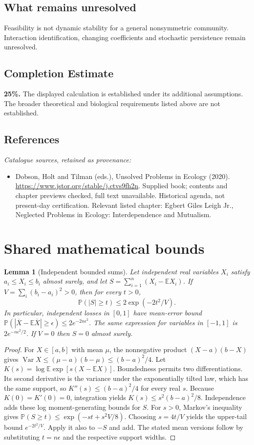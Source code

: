 \documentclass[11pt]{article}
\newcommand{\E}{\mathbb E}
\newcommand{\Prob}{\mathbb P}
\DeclareMathOperator{\Var}{Var}
\providecommand{\E}{\mathbb E}
\providecommand{\Prob}{\mathbb P}
\providecommand{\Var}{\operatorname{Var}}
\newtheorem{sharedlemma}{Lemma}[section]
\begin{document}
\subsection{What remains unresolved}
Feasibility is not dynamic stability for a general nonsymmetric community. Interaction identification, changing coefficients and stochastic persistence remain unresolved.
\subsection{Completion Estimate}
\textbf{25\%.} The displayed calculation is established under its additional assumptions. The broader theoretical and biological requirements listed above are not established.
\subsection{References}
\noindent\emph{Catalogue sources, retained as provenance:}
\begin{itemize}
\item Dobson, Holt and Tilman (eds.), Unsolved Problems in Ecology (2020). \url{https://www.jstor.org/stable/j.ctvs9fh2n}. Supplied book; contents and chapter previews checked, full text unavailable. Historical agenda, not present-day certification. Relevant listed chapter: Egbert Giles Leigh Jr., Neglected Problems in Ecology: Interdependence and Mutualism.
\end{itemize}
\clearpage


\appendix
\section{Shared mathematical bounds}\label{app:bounds}
\begin{sharedlemma}[Independent bounded sums]\label{lem:bounded}
Let independent real variables $X_i$ satisfy $a_i\leq X_i\leq b_i$ almost surely,
and let $S=\sum_{i=1}^n(X_i-\E X_i)$. If
$V=\sum_i(b_i-a_i)^2>0$, then for every $t>0$,
\[
 \Prob(|S|\geq t)\leq 2\exp(-2t^2/V).
\]
In particular, independent losses in $[0,1]$ have mean-error bound
$\Prob(|\overline X-\E\overline X|\geq\epsilon)
\leq2e^{-2n\epsilon^2}$. The same expression for variables in $[-1,1]$
is $2e^{-n\epsilon^2/2}$. If $V=0$ then $S=0$ almost surely.
\end{sharedlemma}
\begin{proof}
For $X\in[a,b]$ with mean $\mu$, the nonnegative product
$(X-a)(b-X)$ gives
$\Var X\leq(\mu-a)(b-\mu)\leq(b-a)^2/4$.
Let $K(s)=\log\E\exp[s(X-\E X)]$.
Boundedness permits two differentiations. Its second derivative is the variance
under the exponentially tilted law, which has the same support, so
$K''(s)\leq(b-a)^2/4$ for every real $s$.
Because $K(0)=K'(0)=0$, integration yields
$K(s)\leq s^2(b-a)^2/8$.
Independence adds these log moment-generating bounds for $S$.
For $s>0$, Markov's inequality gives
$\Prob(S\geq t)\leq\exp(-st+s^2V/8)$.
Choosing $s=4t/V$ yields the upper-tail bound $e^{-2t^2/V}$.
Apply it also to $-S$ and add. The stated mean versions follow by substituting
$t=n\epsilon$ and the respective support widths.
\end{proof}
\end{document}
